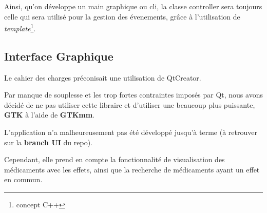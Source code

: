 \documentclass[12pt,a4paper]{report}
\begin{document}
Ainsi, qu'on développe un main graphique ou cli, la classe controller sera toujours celle qui sera utilisé pour la gestion des évenements, grâce à l'utilisation de \textit{template}\footnote{concept C++}. 

\subsection{Interface Graphique}
Le cahier des charges préconisait une utilisation de QtCreator. 

Par manque de souplesse et les trop fortes contraintes imposés par Qt, nous avons décidé de ne pas utiliser cette libraire et d'utiliser une beaucoup plus puissante, \textbf{GTK} à l'aide de \textbf{GTKmm}. 


L'application n'a malheureusement pas été développé jusqu'à terme (à retrouver sur la \textbf{branch UI} du repo). 

Cependant, elle prend en compte la fonctionnalité de visualisation des médicaments avec les effets, ainsi que la recherche de médicaments ayant un effet en commun. 
\end{document}
